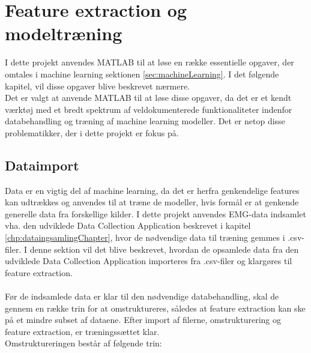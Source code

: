 \thispagestyle{fancy}
\chapter{Feature extraction og modeltræning}
\label{chp:matlabChapter}
I dette projekt anvendes MATLAB til at løse en række essentielle opgaver, der omtales i machine learning sektionen \ref{sec:machineLearning}. I det følgende kapitel, vil disse opgaver blive beskrevet nærmere. \\
Det er valgt at anvende MATLAB til at løse disse opgaver, da det er et kendt værktøj med et bredt spektrum af veldokumenterede funktionaliteter indenfor databehandling\citep{matlabFeatures} og træning af machine learning modeller\citep{matlabML}. Det er netop disse problematikker, der i dette projekt er fokus på. 

\section{Dataimport}
Data er en vigtig del af machine learning, da det er herfra genkendelige features kan udtrækkes og anvendes til at træne de modeller, hvis formål er at genkende generelle data fra forskellige kilder. I dette projekt anvendes EMG-data indsamlet vha. den udviklede Data Collection Application beskrevet i kapitel \ref{chp:dataingsamlingChapter}, hvor de nødvendige data til træning gemmes i .csv-filer. I denne sektion vil det blive beskrevet, hvordan de opsamlede data fra den udviklede Data Collection Application importeres fra .csv-filer og klargøres til feature extraction.
\\\\
Før de indsamlede data er klar til den nødvendige databehandling, skal de gennem en række trin for at omstruktureres, således at feature extraction kan ske på et mindre subset af dataene. Efter import af filerne, omstrukturering og feature extraction, er træningssættet klar.  
\\ Omstruktureringen består af følgende trin:
